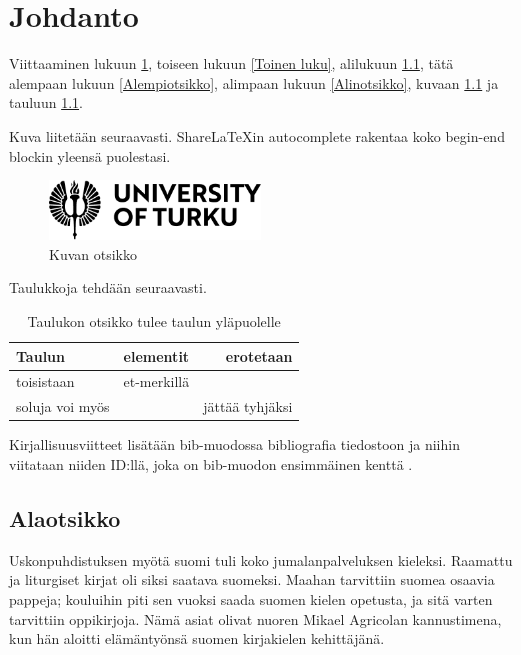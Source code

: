 \chapter{Johdanto} \label{Johdanto}

Viittaaminen lukuun \ref{Johdanto}, toiseen lukuun \ref{Toinen luku},
alilukuun \ref{Alaotsikko}, tätä alempaan lukuun \ref{Alempiotsikko},
alimpaan lukuun \ref{Alinotsikko}, kuvaan \ref{Kuvaesimerkki} ja
tauluun \ref{tab:Taulukon-otsikko-tulee}.

Kuva liitetään seuraavasti. ShareLaTeXin autocomplete rakentaa koko
begin-end blockin yleensä puolestasi.

\begin{figure}
\centering \includegraphics[width=0.5\textwidth]{kuvat/utulogoen}
\caption{Kuvan otsikko}
\label{Kuvaesimerkki} 
\end{figure}

Taulukkoja tehdään seuraavasti.

\begin{table}
\centering{}\caption{Taulukon otsikko tulee taulun yläpuolelle\label{tab:Taulukon-otsikko-tulee}}
\begin{tabular}{l|c|r|}
Taulun  & elementit  & erotetaan \tabularnewline
\hline 
toisistaan  & et-merkillä  & \tabularnewline
soluja voi myös  &  & jättää tyhjäksi \tabularnewline
\end{tabular}
\end{table}

Kirjallisuusviitteet lisätään bib-muodossa bibliografia tiedostoon
ja niihin viitataan niiden ID:llä, joka on bib-muodon ensimmäinen
kenttä \cite{crawley2007write}.

\section{Alaotsikko}

\label{Alaotsikko}

Uskonpuhdistuksen myötä suomi tuli koko jumalanpalveluksen kieleksi.
Raamattu ja liturgiset kirjat oli siksi saatava suomeksi. Maahan tarvittiin
suomea osaavia pappeja; kouluihin piti sen vuoksi saada suomen kielen
opetusta, ja sitä varten tarvittiin oppikirjoja. Nämä asiat olivat
nuoren Mikael Agricolan kannustimena, kun hän aloitti elämäntyönsä
suomen kirjakielen kehittäjänä.

